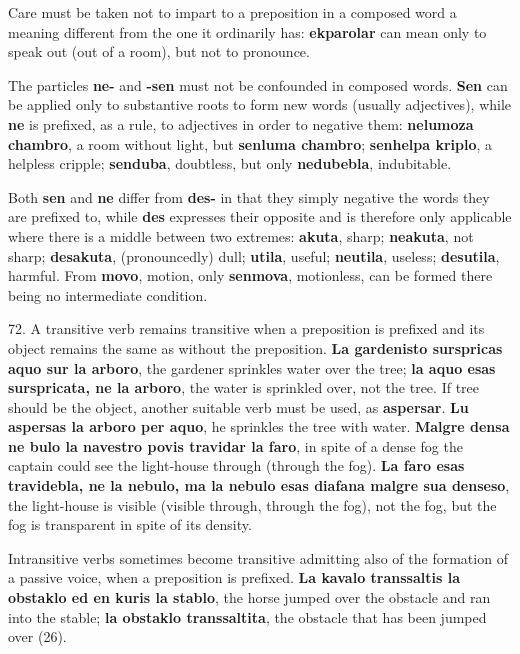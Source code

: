 Care must be taken not to impart to a preposition in a composed word a meaning different from the one it ordinarily has: \textbf{ekparolar} can mean only to speak out (out of a room), but not to pronounce. 

The particles \textbf{ne-} and \textbf{-sen} must not be confounded in composed words. \textbf{Sen} can be applied only to substantive roots to form new words (usually adjectives), while \textbf{ne} is prefixed, as a rule, to adjectives in order to negative them: \textbf{nelumoza chambro}, a room without light, but \textbf{senluma chambro}; \textbf{senhelpa kriplo}, a helpless cripple; \textbf{senduba}, doubtless, but only \textbf{nedubebla}, indubitable. 

Both \textbf{sen} and \textbf{ne} differ from \textbf{des-} in that they simply negative the words they are prefixed to, while \textbf{des} expresses their opposite and is therefore only applicable where there is a middle between two extremes: \textbf{akuta}, sharp; \textbf{neakuta}, not sharp; \textbf{desakuta}, (pronouncedly) dull; \textbf{utila}, useful; \textbf{neutila}, useless; \textbf{desutila}, harmful. From \textbf{movo}, motion, only \textbf{senmova}, motionless, can be formed there being no intermediate condition. 

72. A transitive verb remains transitive when a preposition is prefixed and its object remains the same as without the preposition. \textbf{La gardenisto surspricas aquo sur la arboro}, the gardener sprinkles water over the tree; \textbf{la aquo esas surspricata, ne la arboro}, the water is sprinkled over, not the tree. If tree should be the object, another suitable verb must be used, as \textbf{aspersar}. \textbf{Lu aspersas la arboro per aquo}, he sprinkles the tree with water. \textbf{Malgre densa ne bulo la navestro povis travidar la faro}, in spite of a dense fog the captain could see the light-house through (through the fog). \textbf{La faro esas travidebla, ne la nebulo, ma la nebulo esas diafana malgre sua denseso}, the light-house is visible (visible through, through the fog), not the fog, but the fog is transparent in spite of its density. 

Intransitive verbs sometimes become transitive admitting also of the formation of a passive voice, when a preposition is prefixed. \textbf{La kavalo transsaltis la obstaklo ed en kuris la stablo}, the horse jumped over the obstacle and ran into the stable; \textbf{la obstaklo transsaltita}, the obstacle that has been jumped over (26). 


